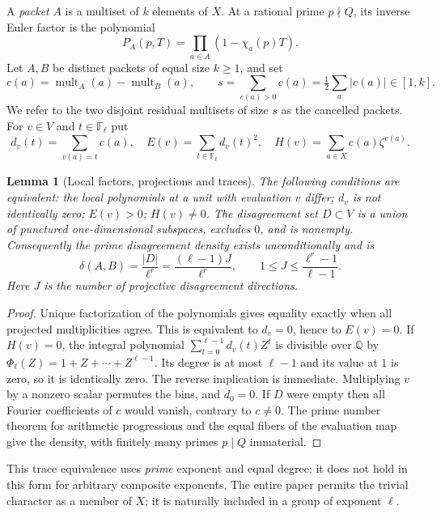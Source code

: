 \documentclass[11pt]{article}
\newtheorem{lemma}[theorem]{Lemma}
\theoremstyle{remark}\newtheorem{remark}[theorem]{Remark}
\newcommand{\F}{\mathbb F}
\newcommand{\1}{\mathbf 1}
\begin{document}
A \emph{packet} $A$ is a multiset of $k$ elements of $X$. At a rational prime $p\nmid Q$, its inverse Euler factor is the polynomial
\[
 P_A(p,T)=\prod_{a\in A}(1-\chi_a(p)T).
\]
Let $A,B$ be distinct packets of equal size $k\ge1$, and set
\[
 c(a)=\operatorname{mult}_A(a)-\operatorname{mult}_B(a),\qquad
 s=\sum_{c(a)>0}c(a)=\tfrac12\sum_a|c(a)|\in[1,k].
\]
We refer to the two disjoint residual multisets of size $s$ as the cancelled packets. For $v\in V$ and $t\in\F_\ell$ put
\[
 d_v(t)=\sum_{v(a)=t}c(a),\quad E(v)=\sum_{t\in\F_\ell}d_v(t)^2,
 \quad H(v)=\sum_{a\in X}c(a)\zeta^{v(a)}.
\]
\begin{lemma}[Local factors, projections and traces]\label{lem:projection}
The following conditions are equivalent: the local polynomials at a unit with evaluation $v$ differ; $d_v$ is not identically zero; $E(v)>0$; $H(v)\ne0$. The disagreement set $D\subset V$ is a union of punctured one-dimensional subspaces, excludes $0$, and is nonempty. Consequently the prime disagreement density exists unconditionally and is
\[
 \delta(A,B)=\frac{|D|}{\ell^r}=\frac{(\ell-1)J}{\ell^r},
 \qquad 1\le J\le\frac{\ell^r-1}{\ell-1}.
\]
Here $J$ is the number of projective disagreement directions.
\end{lemma}
\begin{proof}
Unique factorization of the polynomials gives equality exactly when all projected multiplicities agree. This is equivalent to $d_v=0$, hence to $E(v)=0$. If $H(v)=0$, the integral polynomial $\sum_{t=0}^{\ell-1}d_v(t)Z^t$ is divisible over $\mathbb Q$ by $\Phi_\ell(Z)=1+Z+\cdots+Z^{\ell-1}$. Its degree is at most $\ell-1$ and its value at $1$ is zero, so it is identically zero. The reverse implication is immediate. Multiplying $v$ by a nonzero scalar permutes the bins, and $d_0=0$. If $D$ were empty then all Fourier coefficients of $c$ would vanish, contrary to $c\ne0$. The prime number theorem for arithmetic progressions and the equal fibers of the evaluation map give the density, with finitely many primes $p\mid Q$ immaterial.
\end{proof}

This trace equivalence uses \emph{prime} exponent and equal degree; it does not hold in this form for arbitrary composite exponents. The entire paper permits the trivial character as a member of $X$; it is naturally included in a group of exponent $\ell$.
\end{document}
